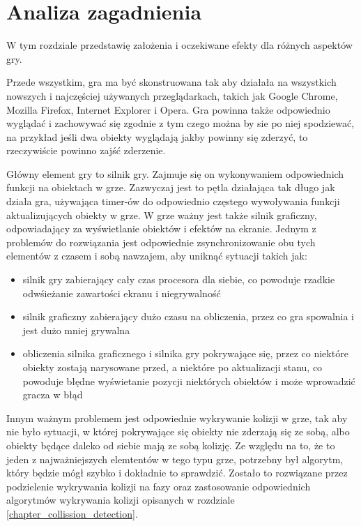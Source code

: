 \chapter{Analiza zagadnienia}
\label{chapter_analysis}
\thispagestyle{chapterBeginStyle}

W tym rozdziale przedstawię założenia i oczekiwane efekty dla różnych aspektów gry.

Przede wszystkim, gra ma być skonstruowana tak aby działała na wszystkich nowszych i najczę\'sciej używanych przeglądarkach, takich jak Google Chrome, Mozilla Firefox, Internet Explorer i Opera.
Gra powinna także odpowiednio wyglądać i zachowywać się zgodnie z tym czego można by sie po niej spodziewać, na przykład je\'sli dwa obiekty wyglądają jakby powinny się zderzyć, to rzeczywi\'scie powinno zaj\'sć zderzenie.

Główny element gry to silnik gry. Zajmuje się on  wykonywaniem odpowiednich funkcji na obiektach w grze.
Zazwyczaj jest to pętla działająca tak długo jak działa gra, używająca timer-ów do odpowiednio częstego wywoływania funkcji aktualizujących obiekty w grze.
W grze ważny jest także silnik graficzny, odpowiadający za wy\'swietlanie obiektów i efektów na ekranie.
Jednym z problemów do rozwiązania jest odpowiednie zsynchronizowanie obu tych elementów z czasem i sobą nawzajem, aby uniknąć sytuacji takich jak:\begin{itemize}
	\item silnik gry zabierający cały czas procesora dla siebie, co powoduje rzadkie odw\'sieżanie zawartości ekranu i niegrywalno\'sć
	\item silnik graficzny zabierający dużo czasu na obliczenia, przez co gra spowalnia i jest dużo mniej grywalna
	\item obliczenia silnika graficznego i silnika gry pokrywające się, przez co niektóre obiekty zostają narysowane przed, a niektóre po aktualizacji stanu, co powoduje błędne wy\'swietanie pozycji niektórych obiektów i może wprowadzić gracza w błąd
\end{itemize}

Innym ważnym problemem jest odpowiednie wykrywanie kolizji w grze, tak aby nie było sytuacji, w której pokrywające się obiekty nie zderzają się ze sobą, albo obiekty będące daleko od siebie mają ze sobą kolizję. Ze względu na to, że to jeden z najważniejszych elemtentów w tego typu grze, potrzebny był algorytm, który będzie mógł szybko i dokładnie to sprawdzić. Zostało to rozwiązane przez podzielenie wykrywania kolizji na fazy oraz zastosowanie odpowiednich algorytmów wykrywania kolizji opisanych w rozdziale \ref{chapter_collission_detection}.

